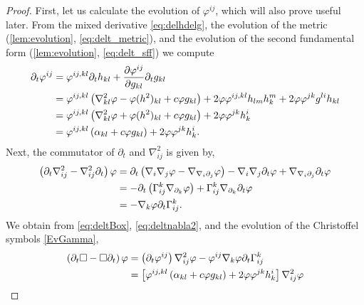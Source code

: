 \documentclass{amsart}
\begin{document}
\begin{proof}
First, let us calculate the evolution of \(\varphi^{ij}\), which will also prove useful later. From the mixed derivative \cref{eq:delhdelg}, the evolution of the metric (\cref{lem:evolution}, \cref{eq:delt_metric}), and the evolution of the second fundamental form (\cref{lem:evolution}, \cref{eq:delt_sff}) we compute
\begin{equation}
\label{eq:deltBox}
\begin{split}
\partial_{t} \varphi^{ij} &= \varphi^{ij,kl} \partial_t h_{kl} + \frac{\partial\varphi^{ij}}{\partial g_{kl}} \partial_t g_{kl} \\
&= \varphi^{ij,kl} \left(\nabla^2_{kl} \varphi - \varphi(h^2)_{kl} + c \varphi g_{kl}\right) + 2\varphi \varphi^{ij,kl} h_{lm}h^{m}_{k} + 2\varphi\varphi^{jk}g^{li}h_{kl} \\
&= \varphi^{ij,kl} \left(\nabla^2_{kl} \varphi + \varphi(h^2)_{kl} + c \varphi g_{kl}\right) + 2\varphi\varphi^{jk}h^{i}_{k} \\
&= \varphi^{ij,kl} \left(\alpha_{kl} + c \varphi g_{kl}\right) + 2\varphi\varphi^{jk}h^{i}_{k}.
\end{split}
\end{equation}
Next, the commutator of \(\partial_t\) and \(\nabla^2_{ij}\) is given by,
\begin{equation}
\label{eq:deltnabla2}
\begin{split}
\left(\partial_{t}\nabla^2_{ij} - \nabla^2_{ij}\partial_{t}\right) \varphi &= \partial_t \left(\nabla_i \nabla_j \varphi - \nabla_{\nabla_i \partial_j} \varphi\right) - \nabla_i \nabla_j \partial_t \varphi + \nabla_{\nabla_i \partial_j} \partial_t \varphi \\
&= - \partial_t \left(\Gamma_{ij}^k \nabla_{\partial_k} \varphi\right) + \Gamma_{ij}^k \nabla_{\partial_k} \partial_t \varphi \\
&= - \nabla_k \varphi \partial_t \Gamma_{ij}^k.
\end{split}
\end{equation}
We obtain from \cref{eq:deltBox}, \cref{eq:deltnabla2}, and the evolution of the Christoffel symbols \cref{EvGamma},
\[
\begin{split}
\left(\partial_{t}\Box - \Box\partial_{t}\right) \varphi &= \left(\partial_{t}\varphi^{ij}\right) \nabla^2_{ij} \varphi - \varphi^{ij}\nabla_k \varphi\partial_t \G^{k}_{ij} \\
&= \left[\varphi^{ij,kl} \left(\a_{kl} + c \varphi g_{kl}\right) + 2\varphi\varphi^{jk}h^{i}_{k}\right] \nabla^2_{ij} \varphi \\

\end{split}\]
\end{proof}
\end{document}
